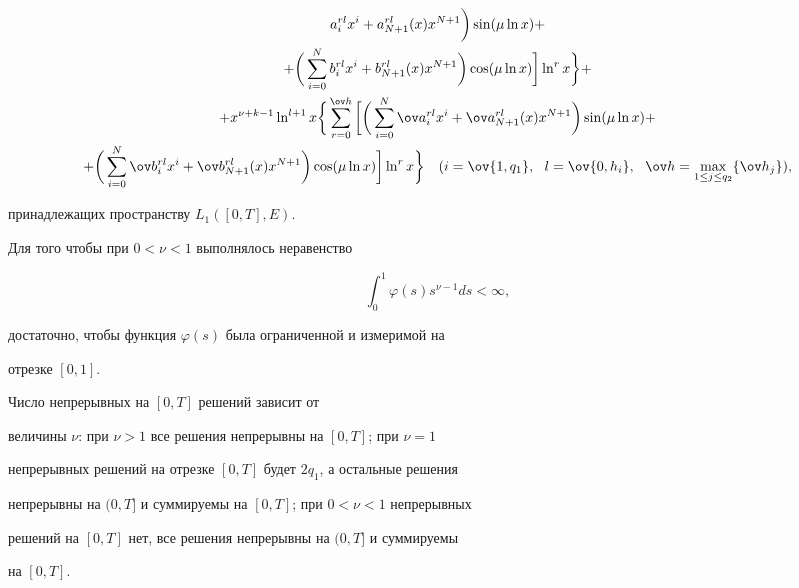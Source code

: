 \begin{thmnonum}
\begin{gather*}
a^{rl}_i x^i+a^{rl}_{N+1}(x)x^{N+1}\bigg)\sin(\mu\ln x)+\\


%


+\bigg(\sum^N_{i=0}b^{rl}_i x^i+b^{rl}_{N+1}(x)x^{N+1}\bigg)


\cos(\mu\ln x)\bigg]\ln^r x\bigg\}+ \\


%


+x^{\nu+k-1}\ln^{l+1}x\bigg\{\sum^{\ov h}_{r=0}\bigg[\bigg(


\sum^N_{i=0}


\ov a{}^{rl}_i x^i+\ov a{}^{rl}_{N+1}(x)x^{N+1}\bigg)\sin(\mu\ln x)+ \\


%


+\bigg(\sum^N_{i=0}


\ov b{}^{rl}_i x^i+\ov b{}^{rl}_{N+1}(x)x^{N+1}\bigg)\cos(\mu\ln x)


\bigg]\ln^r x\bigg\}\quad (i=\ov{1,q_1},\ \ l=\ov{0,h_i},


\ \ \ov h=\max_{1\le j\le q_2}\{\ov h_j\}),


\end{gather*}


принадлежащих пространству $L_1([0,T],E)$. 


\end{thmnonum}





\begin{note}


Для того чтобы при $0<\nu<1$ выполнялось неравенство


$$


\int^1_0\varphi(s)s^{\nu-1}ds<\infty,


$$


достаточно, чтобы функция $\varphi(s)$ была ограниченной и измеримой на 


отрезке $[0,1]$.


\end{note}





\begin{note}


Число непрерывных на $[0,T]$ решений зависит от 


величины $\nu$: при $\nu>1$ все решения непрерывны на $[0,T]$; при $\nu=1$ 


непрерывных решений на отрезке $[0,T]$ будет $2q_1$, а остальные решения 


непрерывны на $(0,T]$ и суммируемы на $[0,T]$; при $0<\nu<1$ непрерывных 


решений на $[0,T]$ нет, все решения непрерывны на $(0,T]$ и суммируемы 


на $[0,T]$.


\end{note}








